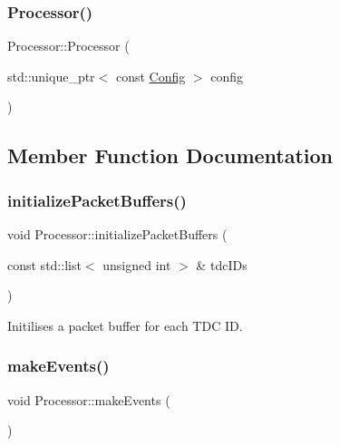 \subsubsection{\texorpdfstring{Processor()}{Processor()}}
{\footnotesize\ttfamily Processor\+::\+Processor (\begin{DoxyParamCaption}\item[{std\+::unique\+\_\+ptr$<$ const \hyperlink{class_config}{Config} $>$}]{config }\end{DoxyParamCaption})}



\subsection{Member Function Documentation}
\mbox{\label{class_processor_aa9ad1e9d6f3d217e23649e42cd07de90}} 
\subsubsection{\texorpdfstring{initialize\+Packet\+Buffers()}{initializePacketBuffers()}}
{\footnotesize\ttfamily void Processor\+::initialize\+Packet\+Buffers (\begin{DoxyParamCaption}\item[{const std\+::list$<$ unsigned int $>$ \&}]{tdc\+I\+Ds }\end{DoxyParamCaption})\hspace{0.3cm}{\ttfamily [private]}}



Initilises a packet buffer for each T\+DC ID. 

\mbox{\label{class_processor_ae06672fc3ac6ef73525b64d4f9f769e7}} 
\subsubsection{\texorpdfstring{make\+Events()}{makeEvents()}}
{\footnotesize\ttfamily void Processor\+::make\+Events (\begin{DoxyParamCaption}{ }\end{DoxyParamCaption})\hspace{0.3cm}{\ttfamily [private]}}



